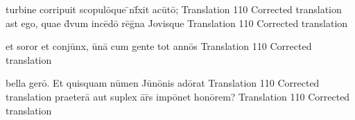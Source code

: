 \documentclass[]{article}
\begin{document}
\latline
  {turbine corripuit scopul\={\macron o}que \={\macron{\i}}nf\={\macron{\i}}xit ac\={\macron u}t\={\macron o};}
  {Translation}
  {110} %
  {Corrected translation}
  {
  }
\newpage
\latline
  {ast ego, quae d\={\macron{\i}}vum inc\={\macron e}d\={\macron o} r\={\macron e}g\={\macron{\i}}na Jovisque}
  {Translation}
  {110} %
  {Corrected translation}
  {
  }

\latline
  {et soror et conj\={\macron u}nx, \={\macron u}n\={\macron a} cum gente tot ann\={\macron o}s}
  {Translation}
  {110} %
  {Corrected translation}
  {
  }

\latline
  {bella ger\={\macron o}.  Et quisquam n\={\macron u}men J\={\macron u}n\={\macron o}nis ad\={\macron o}rat}
  {Translation}
  {110} %
  {Corrected translation}
  {
  }
\newpage
\latline
  {praeter\={\macron a} aut suplex \={\macron a}r\={\macron{\i}}s imp\={\macron o}net hon\={\macron o}rem?}
  {Translation}
  {110} %
  {Corrected translation}
  {
  }
\end{document}
